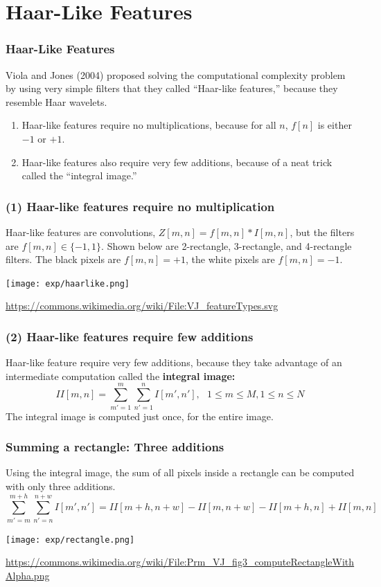 \documentclass{beamer}
\begin{document}
\section[Features]{Haar-Like Features}
\setcounter{subsection}{1}

\begin{frame}
  \frametitle{Haar-Like Features}

  Viola and Jones (2004) proposed solving the computational complexity
  problem by using very simple filters that they called ``Haar-like
  features,'' because they resemble Haar wavelets.
  \begin{enumerate}
  \item Haar-like features require no multiplications, because for all
    $n$, $f[n]$ is either $-1$ or $+1$.
  \item Haar-like features also require very few additions, because of
    a neat trick called the ``integral image.''
  \end{enumerate}
\end{frame}

\begin{frame}
  \frametitle{(1) Haar-like features require no multiplication}

  Haar-like features are convolutions, $Z[m,n]=f[m,n]\ast I[m,n]$, but
  the filters are $f[m,n]\in\{-1,1\}$.  Shown below are 2-rectangle,
  3-rectangle, and 4-rectangle filters.  The black pixels are
  $f[m,n]=+1$, the white pixels are $f[m,n]=-1$. 

  \centerline{\texttt{[image: exp/haarlike.png]}}
  \url{https://commons.wikimedia.org/wiki/File:VJ_featureTypes.svg}
\end{frame}

\begin{frame}
  \frametitle{(2) Haar-like features require few additions}

  Haar-like feature require very few additions, because they take
  advantage of an intermediate computation called the \textbf{integral
    image:}
  \begin{displaymath}
    II[m,n] = \sum_{m'=1}^m\sum_{n'=1}^n I[m',n'],~~~1\le m\le M,1\le n\le N
  \end{displaymath}
  The integral image is computed just once, for the entire image.
\end{frame}

\begin{frame}
  \frametitle{Summing a rectangle: Three additions}

  Using the integral image, the sum of all pixels inside a rectangle
  can be computed with only three additions.
  \begin{displaymath}
    \sum_{m'=m}^{m+h}\sum_{n'=n}^{n+w}I[m',n'] = II[m+h,n+w]-II[m,n+w]-II[m+h,n]+II[m,n]
  \end{displaymath}
  
  \centerline{\texttt{[image: exp/rectangle.png]}}
  \url{https://commons.wikimedia.org/wiki/File:Prm_VJ_fig3_computeRectangleWithAlpha.png}
\end{frame}
\end{document}
